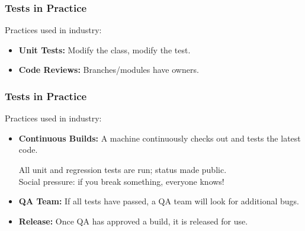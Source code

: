 \begin{frame}
\frametitle{Tests in Practice}

\begin{changemargin}{1cm}

Practices used in industry:

\begin{itemize}
\item \textbf{Unit Tests:} Modify the class, modify the test. 

\item \textbf{Code Reviews:} Branches/modules have owners. 


\end{itemize}
\end{changemargin}
\end{frame}

\begin{frame}
\frametitle{Tests in Practice}

\begin{changemargin}{1cm}

Practices used in industry:

\begin{itemize}

\item \textbf{Continuous Builds:} A machine continuously checks out and tests the latest code.

All unit and regression tests are run; status made public. \\

Social pressure: if you break something, everyone knows!

\item \textbf{QA Team:} If all tests have passed, a QA team will look for additional bugs.

\item \textbf{Release:} Once QA has approved a build, it is released for use.
\end{itemize}
\end{changemargin}
\end{frame}

